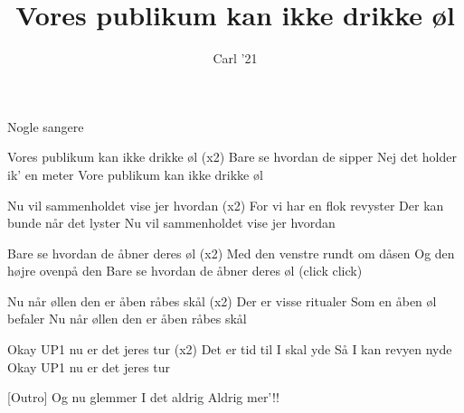\documentclass[a4paper,11pt]{article}
\title{Vores publikum kan ikke drikke øl}
\author{Carl '21}
\begin{document}
\maketitle

\begin{roles}
 Nogle sangere 
\end{roles}


\begin{song}


 Vores publikum kan ikke drikke øl (x2)
    Bare se hvordan de sipper
    Nej det holder ik' en meter
    Vore publikum kan ikke drikke øl

    Nu vil sammenholdet vise jer hvordan (x2)
    For vi har en flok revyster
    Der kan bunde når det lyster
    Nu vil sammenholdet vise jer hvordan


 Bare se hvordan de åbner deres øl (x2)
    Med den venstre rundt om dåsen
    Og den højre ovenpå den
    Bare se hvordan de åbner deres øl (click click)

    Nu når øllen den er åben råbes skål (x2)
    Der er visse ritualer
    Som en åben øl befaler
    Nu når øllen den er åben råbes skål


 Okay UP1 nu er det jeres tur (x2)
    Det er tid til I skal yde
    Så I kan revyen nyde
    Okay UP1 nu er det jeres tur



[Outro] Og nu glemmer
    I det aldrig
    Aldrig mer'!!

\end{song}
\end{document}
